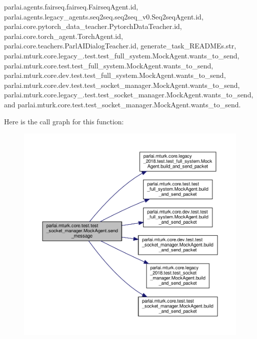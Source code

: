 parlai.\+agents.\+fairseq.\+fairseq.\+Fairseq\+Agent.\+id, parlai.\+agents.\+legacy\+\_\+agents.\+seq2seq.\+seq2seq\+\_\+v0.\+Seq2seq\+Agent.\+id, parlai.\+core.\+pytorch\+\_\+data\+\_\+teacher.\+Pytorch\+Data\+Teacher.\+id, parlai.\+core.\+torch\+\_\+agent.\+Torch\+Agent.\+id, parlai.\+core.\+teachers.\+Parl\+A\+I\+Dialog\+Teacher.\+id, generate\+\_\+task\+\_\+\+R\+E\+A\+D\+M\+Es.\+str, parlai.\+mturk.\+core.\+legacy\+\_.\+test.\+test\+\_\+full\+\_\+system.\+Mock\+Agent.\+wants\+\_\+to\+\_\+send, parlai.\+mturk.\+core.\+test.\+test\+\_\+full\+\_\+system.\+Mock\+Agent.\+wants\+\_\+to\+\_\+send, parlai.\+mturk.\+core.\+dev.\+test.\+test\+\_\+full\+\_\+system.\+Mock\+Agent.\+wants\+\_\+to\+\_\+send, parlai.\+mturk.\+core.\+dev.\+test.\+test\+\_\+socket\+\_\+manager.\+Mock\+Agent.\+wants\+\_\+to\+\_\+send, parlai.\+mturk.\+core.\+legacy\+\_.\+test.\+test\+\_\+socket\+\_\+manager.\+Mock\+Agent.\+wants\+\_\+to\+\_\+send, and parlai.\+mturk.\+core.\+test.\+test\+\_\+socket\+\_\+manager.\+Mock\+Agent.\+wants\+\_\+to\+\_\+send.

Here is the call graph for this function\+:
\nopagebreak
\begin{figure}[H]
\begin{center}
\leavevmode
\includegraphics[width=350pt]{classparlai_1_1mturk_1_1core_1_1test_1_1test__socket__manager_1_1MockAgent_afc1922a7c72563531ab91a1244776f2d_cgraph}
\end{center}
\end{figure}
\mbox{\label{classparlai_1_1mturk_1_1core_1_1test_1_1test__socket__manager_1_1MockAgent_a8093cf5f5ce398010769e21ab23e2859}} 
